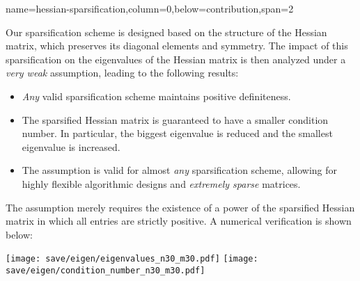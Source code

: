 {name=hessian-sparsification,column=0,below=contribution,span=2}
{
    Our sparsification scheme is designed based on the structure of the Hessian matrix, which preserves its diagonal elements and symmetry. The impact of this sparsification on the eigenvalues of the Hessian matrix is then analyzed under a \emph{very weak} assumption, leading to the following results:
    \begin{itemize}
        \item \emph{Any} valid sparsification scheme maintains positive definiteness.
        \item The sparsified Hessian matrix is guaranteed to have a smaller condition number. In particular, the biggest eigenvalue is reduced and the smallest eigenvalue is increased.
        \item The assumption is valid for almost \emph{any} sparsification scheme, allowing for highly flexible algorithmic designs and \emph{extremely sparse} matrices.
    \end{itemize}
    The assumption merely requires the existence of a power of the sparsified Hessian matrix in which all entries are strictly positive. A numerical verification is shown below:

    \vspace{0.5em}

    \begin{center}
    \texttt{[image: save/eigen/eigenvalues\_n30\_m30.pdf]}
    \hfill
    \texttt{[image: save/eigen/condition\_number\_n30\_m30.pdf]}
    \end{center}
}
